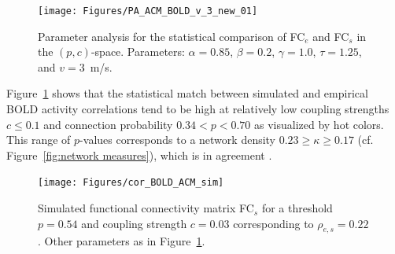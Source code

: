 \documentclass[fleqn,10pt]{wlpeerj}
\newcommand{\red}[1]{\textcolor{red}{(#1)}}
\begin{document}
\begin{figure}[t!]
\centering
	\texttt{[image: Figures/PA\_ACM\_BOLD\_v\_3\_new\_01]}  
\caption{Parameter analysis for the statistical comparison of FC$_e$ and FC$_s$ in the $(p,c)$-space. Parameters:
$\alpha = 0.85$, $\beta=0.2$, $\gamma=1.0$, $\tau=1.25$, and $v=3$~m/s.\\
}
\label{fig:PA_p_c}
\end{figure}

Figure~\ref{fig:PA_p_c} shows that the statistical match between simulated and empirical BOLD activity correlations tend
to be high at relatively low coupling strengths $c \leq 0.1$ and connection probability $0.34 <p<0.70$ as visualized by
hot colors. This range of $p$-values corresponds to a network density $0.23 \geq \kappa \geq 0.17$ (cf.
Figure~\ref{fig:network measures}), which is in agreement \cite{BUL11}. 

\begin{figure}[htpb]\centering
	 \texttt{[image: Figures/cor\_BOLD\_ACM\_sim]} 
  \caption{Simulated functional connectivity matrix FC$_s$ for a threshold $p=0.54$ and coupling
strength $c=0.03$ corresponding to $\rho_{e,s} = 0.22$.
Other parameters as in Figure~\ref{fig:PA_p_c}.} 
    \label{fig:BOLD_e_s}
\end{figure}  
\end{document}
